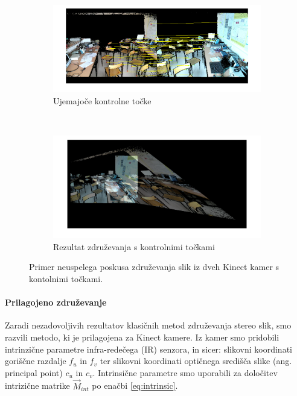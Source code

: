 \begin{figure}[htb]
	\centering
	\begin{subfigure}[t]{0.45\columnwidth}
		\includegraphics[width=\columnwidth]{./Slike/matched-points.png}
		\caption{Ujemajoče kontrolne točke}
		\label{fig:zdruzevanje-ujemajoce-cp}
	\end{subfigure}
	~
	\begin{subfigure}[t]{0.45\columnwidth}
		\includegraphics[width=\columnwidth]{./Slike/points-calibration-result.png}
		\caption{Rezultat združevanja s kontrolnimi točkami}
		\label{fig:zdruzevanje-result-cp}
	\end{subfigure}
	\caption{Primer neuspelega poskusa združevanja slik iz dveh Kinect kamer s kontolnimi točkami.}
	\label{fig:zdruzevanje-cp}
\end{figure}


\paragraph{Prilagojeno združevanje}
Zaradi nezadovoljivih rezultatov klasičnih metod združevanja stereo slik, smo razvili metodo, ki je prilagojena za Kinect kamere. Iz kamer smo pridobili intrinzične parametre infra-redečega (IR) senzora, in sicer: slikovni koordinati goriščne razdalje $f_u$ in $f_v$ ter slikovni koordinati optičnega središča slike (ang. principal point) $c_u$ in $c_v$. Intrinsične parametre smo uporabili za določitev intrizične matrike $\vec{M}_{int}$ po enačbi \eqref{eq:intrinsic}.


